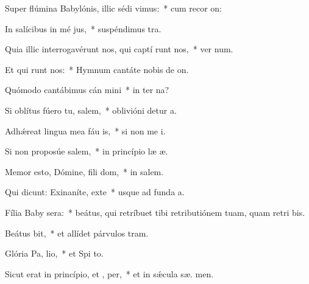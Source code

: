 \item Super flúmina Babylónis, illic sédi  vimus:~* cum recor on:
\item In salícibus in mé jus,~* suspéndimus  tra.
\item Quia illic interrogavérunt nos, qui captí runt nos,~* ver num.
\item Et qui runt nos:~* Hymnum cantáte nobis de  on.
\item Quómodo cantábimus cán mini~* in ter na?
\item Si oblítus fúero tu, salem,~* oblivióni detur  a.
\item Adhǽreat lingua mea fáu is,~* si non me i.
\item Si non proposúe salem,~* in princípio læ æ.
\item Memor esto, Dómine, fili dom,~* in  salem.
\item Qui dicunt: Exinaníte, exte~* usque ad funda  a.
\item Fília Baby sera:~* beátus, qui retríbuet tibi retributiónem tuam, quam retri bis.
\item Beátus  bit,~* et allídet párvulos   tram.
\item Glória Pa,  lio,~* et Spi to.
\item Sicut erat in princípio, et ,  per,~* et in sǽcula sæ. men.

